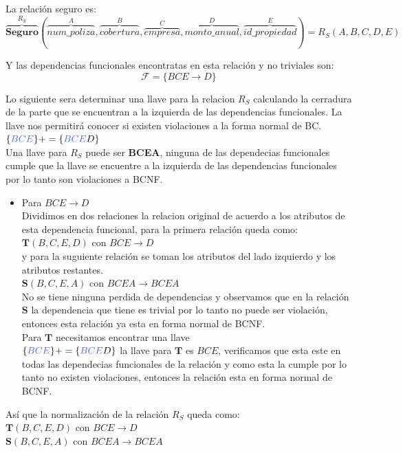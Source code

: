 \documentclass[10pt]{article}
\begin{document}
\begin{enumerate}
    	La relación seguro es:
    	\[\overbrace{{\textbf{Seguro}}}^{\textbf{$R_{S}$}} 
    	(
    	\overbrace{num\_poliza}^{A}, \overbrace{cobertura}^{B},
    	\overbrace{empresa}^{C}, \overbrace{monto\_anual}^{D}, \overbrace{id\_propiedad}^{E}
    	)
    	= 
    	\textbf{$R_S$}(A,B,C,D,E)
    	\]
    	
    	Y las dependencias funcionales encontratas en esta relación  y no triviales son:\\
    	\[\mathcal{F} = \{BCE \rightarrow D\}\]
    	
    	Lo siguiente sera determinar una llave para la relacion $R_S$ calculando la cerradura de la parte que se encuentran a la izquierda de las dependencias funcionales. La llave nos permitirá conocer si existen violaciones a la forma normal de BC.\\
    	
    	$\{\textcolor{RoyalBlue}{BCE}\}+= \{\textcolor{RoyalBlue}{BCE}D\}$\\
    	
    	Una llave para $R_S$ puede ser \textbf{BCEA}, ninguna de las dependecias funcionales cumple que la llave se encuentre a la izquierda de las dependencias funcionales por lo tanto son violaciones a BCNF.\\
    	\begin{itemize}
    		\item Para $BCE \rightarrow D$\\
    		Dividimos en dos relaciones la relacion original de acuerdo a los atributos de esta dependencia funcional, para la primera relación queda como:\\
    		
    		$\textbf{T}(B,C,E,D)$ con $BCE \rightarrow D$\\
    		
    		y para la suguiente relación se toman los atributos del lado izquierdo y los atributos restantes.\\
    		
    		$\textbf{S}(B,C,E,A)$ con $BCEA \rightarrow BCEA$\\ 
    		
    		No se tiene ninguna perdida de dependencias y observamos que en la relación
    		$\textbf{S}$ la dependencia que tiene es trivial por lo tanto no puede ser violación, entonces esta relación ya esta en forma normal de BCNF. \\
    		Para $\textbf{T}$  necesitamos encontrar una llave\\
    		$\{\textcolor{RoyalBlue}{BCE}\}+= \{\textcolor{RoyalBlue}{BCE}D\}$ la llave para $\textbf{T}$ es $BCE$, verificamos que esta este en todas las dependecias funcionales de la relación y como esta la cumple por lo tanto no existen violaciones, entonces la relación esta en forma normal de BCNF.\\
    	\end{itemize}
    	Así que la normalización de la relación $R_S$ queda como:\\
    	$\textbf{T}(B,C,E,D)$ con $BCE \rightarrow D$\\
    	$\textbf{S}(B,C,E,A)$ con $BCEA \rightarrow BCEA$\\ 
    	

\end{enumerate}
\end{document}

